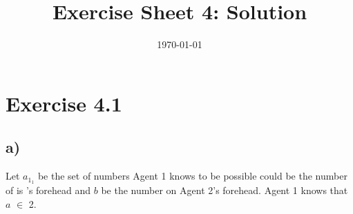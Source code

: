 \documentclass[a4paper]{article}
\begin{document}
\title{Exercise Sheet 4: Solution}
\author{}
\date{\today}

\section{Exercise 4.1}
\subsection{a)}

Let $a_{1_1}$ be the set of numbers Agent 1 knows to be possible could be the number of is 's forehead and $b$ be the number on
Agent 2's forehead.
Agent 1 knows that $a$ $\in$ {2}.
\end{document}
